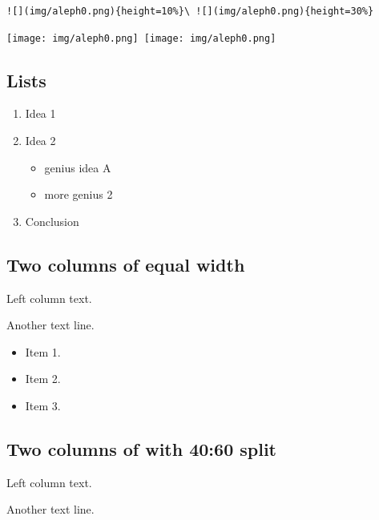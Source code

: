 \documentclass[
  11pt,
  ignorenonframetext,
]{article}
\providecommand{\tightlist}{%
  \setlength{\itemsep}{0pt}\setlength{\parskip}{0pt}}
\begin{document}
\subsubsection{}\label{section-1}

\begin{verbatim}
![](img/aleph0.png){height=10%}\ ![](img/aleph0.png){height=30%} 
\end{verbatim}

\texttt{[image: img/aleph0.png]}~\texttt{[image: img/aleph0.png]}

\subsection{Lists}\label{lists}

\begin{enumerate}
\tightlist
\item
  Idea 1
\item
  Idea 2

  \begin{itemize}
  \tightlist
  \item
    genius idea A
  \item
    more genius 2
  \end{itemize}
\item
  Conclusion
\end{enumerate}

\subsection{Two columns of equal
width}\label{two-columns-of-equal-width}

Left column text.

Another text line.

\begin{itemize}
\tightlist
\item
  Item 1.
\item
  Item 2.
\item
  Item 3.
\end{itemize}

\subsection{Two columns of with 40:60
split}\label{two-columns-of-with-4060-split}

Left column text.

Another text line.
\end{document}
